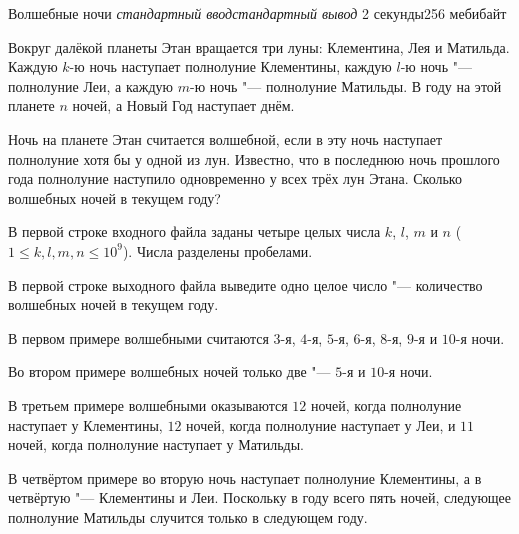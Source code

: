 
\gdef\thisproblemauthor{Иван Казменко}
\begin{problem}{Волшебные ночи}
{\textsl{стандартный ввод}}{\textsl{стандартный вывод}}
{2 секунды}{256 мебибайт}{}

Вокруг далёкой планеты Этан вращается три луны: Клементина, Лея и Матильда.
Каждую $k$-ю ночь наступает полнолуние Клементины,
каждую $l$-ю ночь "--- полнолуние Леи,
а каждую $m$-ю ночь "--- полнолуние Матильды.
В году на этой планете $n$ ночей, а Новый Год наступает днём.

Ночь на планете Этан считается волшебной, если в эту ночь наступает
полнолуние хотя бы у одной из лун.
Известно, что в последнюю ночь прошлого года полнолуние наступило
одновременно у всех трёх лун Этана.
Сколько волшебных ночей в текущем году?

\InputFile

В первой строке входного файла заданы четыре целых числа $k$, $l$, $m$ и $n$
($1 \le k, l, m, n \le 10^9$).
Числа разделены пробелами.

\OutputFile

В первой строке выходного файла выведите одно целое число "---
количество волшебных ночей в текущем году.

\Examples

\begin{example}%
%
%
%
%
\end{example}

\Explanations

В первом примере волшебными считаются
$3$-я, $4$-я, $5$-я, $6$-я, $8$-я, $9$-я и $10$-я ночи.

Во втором примере волшебных ночей только две "--- $5$-я и $10$-я ночи.

В третьем примере волшебными оказываются $12$ ночей, когда полнолуние
наступает у Клементины, $12$ ночей, когда полнолуние наступает у Леи,
и $11$ ночей, когда полнолуние наступает у Матильды.

В четвёртом примере во вторую ночь наступает полнолуние Клементины,
а в четвёртую "--- Клементины и Леи.
Поскольку в году всего пять ночей, следующее полнолуние Матильды случится
только в следующем году.

%

\end{problem}
